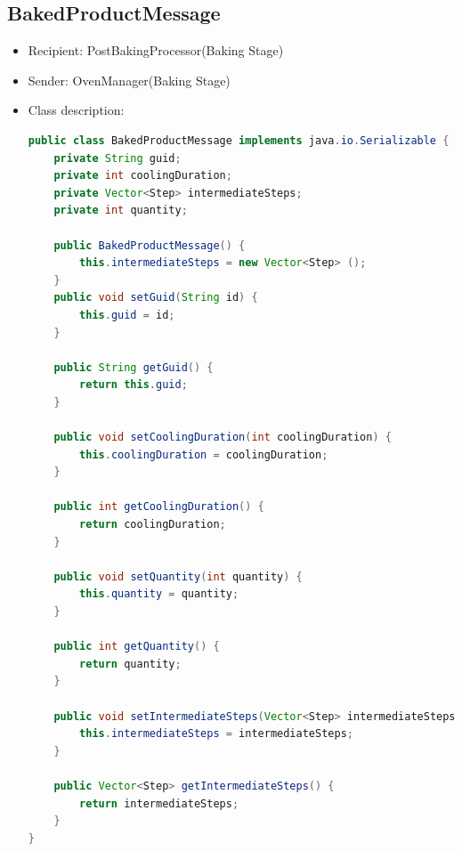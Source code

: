 \documentclass[12pt]{article}
\begin{document}
\subsection{BakedProductMessage}
\begin{itemize}
\item Recipient: PostBakingProcessor(Baking Stage)
\item Sender: OvenManager(Baking Stage)
\item Class description:
\begin{lstlisting}[language=Java]
public class BakedProductMessage implements java.io.Serializable {
    private String guid;
    private int coolingDuration;
    private Vector<Step> intermediateSteps;
    private int quantity;
    
	public BakedProductMessage() {
        this.intermediateSteps = new Vector<Step> ();
	}
    public void setGuid(String id) {
        this.guid = id;
    }

    public String getGuid() {
        return this.guid;
    }

    public void setCoolingDuration(int coolingDuration) {
        this.coolingDuration = coolingDuration;
    }

    public int getCoolingDuration() {
        return coolingDuration;
    }

    public void setQuantity(int quantity) {
        this.quantity = quantity;
    }

    public int getQuantity() {
        return quantity;
    }

    public void setIntermediateSteps(Vector<Step> intermediateSteps) {
        this.intermediateSteps = intermediateSteps;
    }

    public Vector<Step> getIntermediateSteps() {
        return intermediateSteps;
    }
}
\end{lstlisting}
\end{itemize}
\end{document}
